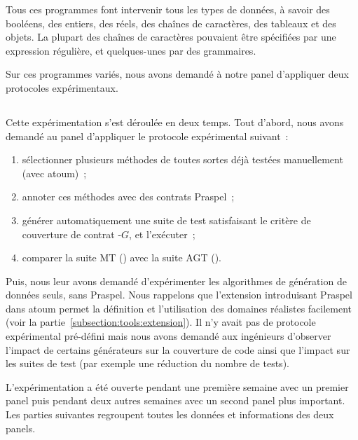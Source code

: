 Tous ces programmes font intervenir tous les types de données, à savoir des
booléens, des entiers, des réels, des chaînes de caractères, des tableaux et des
objets. La plupart des chaînes de caractères pouvaient être spécifiées par une
expression régulière, et quelques-unes par des grammaires.

Sur ces programmes variés, nous avons demandé à notre panel d'appliquer deux
protocoles expérimentaux.

\subsection{}
\label{subsection:experimentation:modus_operandi}

Cette expérimentation s'est déroulée en deux temps. Tout d'abord, nous avons
demandé au panel d'appliquer le protocole expérimental suivant~:
%
\begin{enumerate}

\item sélectionner plusieurs méthodes de toutes sortes déjà testées
manuellement (avec atoum)~;

\item annoter ces méthodes avec des contrats Praspel~;

\item générer automatiquement une suite de test satisfaisant le critère de
couverture de contrat -$G$, et l'exécuter~;

\item comparer la suite MT () avec la suite AGT
().

\end{enumerate}

Puis, nous leur avons demandé d'expérimenter les algorithmes de génération de
données seuls, sans Praspel. Nous rappelons que l'extension introduisant Praspel
dans atoum permet la définition et l'utilisation des domaines réalistes
facilement (voir la partie~\ref{subsection:tools:extension}). Il n'y avait pas
de protocole expérimental pré-défini mais nous avons demandé aux ingénieurs
d'observer l'impact de certains générateurs sur la couverture de code ainsi que
l'impact sur les suites de test (par exemple une réduction du nombre de
tests).

L'expérimentation a été ouverte pendant une première semaine avec un premier
panel puis pendant deux autres semaines avec un second panel plus important. Les
parties suivantes regroupent toutes les données et informations des deux panels.

